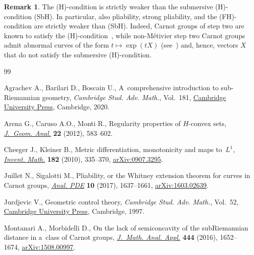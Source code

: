 \documentclass[10pt,a4paper]{amsart}
\numberwithin{equation}{section}
\theoremstyle{definition}
\newtheorem{Remark}[Theorem]{Remark}
\begin{document}
\begin{Remark}
 \label{rem:nostrongH}
The (H)-condition is strictly weaker than the submersive (H)-condition (SbH).
In particular, also pliability, strong pliability, and the (FH)-condition are strictly weaker than (SbH).
Indeed,
Carnot groups of step two
are known to satisfy the (H)-condition~\cite[Theorem~2.1]{Morbidelli},
 while non-M\'{e}tivier step two Carnot groups admit abnormal curves of the form $t\mapsto \exp(tX)$
 (see~\cite[Proposition~3.6]{Montanari-Morbidelli-JMMA})
 and, hence, vectors $X$ that do not satisfy the submersive (H)-condition.
\end{Remark}



\begin{thebibliography}{99}
\footnotesize\itemsep=0pt

Agrachev A., Barilari D., Boscain U., A~comprehensive introduction to
 sub-{R}iemannian geometry, \textit{Cambridge Stud. Adv. Math.}, Vol.~181,
 \href{https://doi.org/10.1017/9781108677325}{Cambridge University Press},
 Cambridge, 2020.

Arena G., Caruso A.O., Monti R., Regularity properties of {$H$}-convex sets,
 \href{https://doi.org/10.1007/s12220-010-9203-7}{\textit{J.~Geom. Anal.}}
 \textbf{22} (2012), 583--602.

Cheeger J., Kleiner B., Metric differentiation, monotonicity and maps
 to~{$L^1$}, \href{https://doi.org/10.1007/s00222-010-0264-9}{\textit{Invent.
 Math.}} \textbf{182} (2010), 335--370,
 \href{http://arxiv.org/abs/0907.3295}{arXiv:0907.3295}.

Juillet N., Sigalotti M., Pliability, or the {W}hitney extension theorem for
 curves in {C}arnot groups,
 \href{https://doi.org/10.2140/apde.2017.10.1637}{\textit{Anal. {PDE}}}
 \textbf{10} (2017), 1637--1661,
 \href{http://arxiv.org/abs/1603.02639}{arXiv:1603.02639}.

Jurdjevic V., Geometric control theory, \textit{Cambridge Stud. Adv. Math.},
 Vol.~52, \href{https://doi.org/10.1017/CBO9780511530036}{Cambridge University
 Press}, Cambridge, 1997.

Montanari A., Morbidelli D., On the lack of semiconcavity of the
 sub{R}iemannian distance in a~class of {C}arnot groups,
 \href{https://doi.org/10.1016/j.jmaa.2016.07.032}{\textit{J.~Math. Anal.
 Appl.}} \textbf{444} (2016), 1652--1674,
 \href{http://arxiv.org/abs/1508.00997}{arXiv:1508.00997}.


\end{thebibliography}
\end{document}
